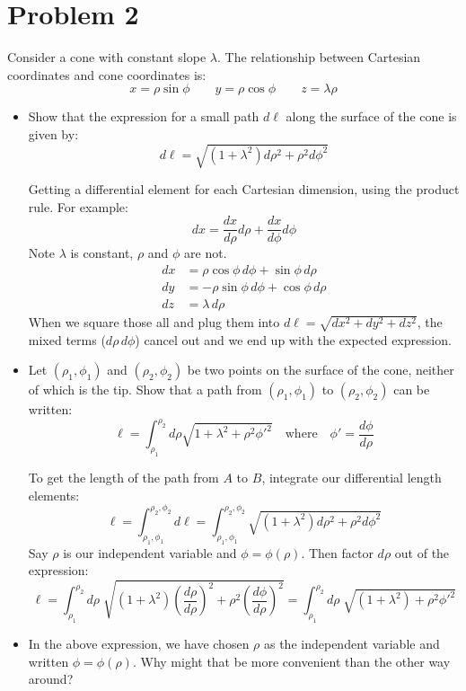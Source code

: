 \documentclass{article}
\newcommand{\purple}[1]{{\color{purple} #1}}
\begin{document}
\newpage

\section*{Problem 2}

Consider a cone with constant slope $\lambda$. The relationship between Cartesian coordinates and cone coordinates is:
$$
x=\rho \sin\phi
\quad \quad 
y=\rho \cos\phi
\quad \quad
z=\lambda\rho
$$

\begin{itemize}
    \item Show that the expression for a small path $d\ell$ along the surface of the cone is given by:
    $$
    d\ell = \sqrt{ \left( 1 + \lambda^2 \right) d\rho^2 + \rho^2 d\phi^2}
    $$
    
    \purple{
    Getting a differential element for each Cartesian dimension, using the product rule. For example:
    $$
    dx = \frac{dx}{d\rho} d\rho + \frac{dx}{d\phi} d\phi
    $$
    Note $\lambda$ is constant, $\rho$ and $\phi$ are not.
    \begin{align*}
        dx &= \rho \cos\phi \, d\phi + \sin\phi \, d\rho \\
        dy &= -\rho \sin\phi \, d\phi + \cos\phi \, d\rho \\
        dz &= \lambda \, d\rho
    \end{align*}
    When we square those all and plug them into $d\ell = \sqrt{ dx^2 + dy^2 + dz^2}$, the mixed terms ($d\rho \, d\phi$) cancel out and we end up with the expected expression.
    }
    \item Let $(\rho_1, \phi_1)$ and $(\rho_2, \phi_2)$ be two points on the surface of the cone, neither of which is the tip. Show that a path from $(\rho_1, \phi_1)$ to $(\rho_2, \phi_2)$ can be written:
    $$
    \ell = \displaystyle \int_{\rho_1}^{\rho_2} d\rho \sqrt{1 + \lambda^2 + \rho^2 \phi'^2}
    \quad \mathrm{where} \quad
    \phi' = \frac{d\phi}{d\rho}
    $$
    
    \purple{
    To get the length of the path from $A$ to $B$, integrate our differential length elements:
    $$
    \ell = \displaystyle\int_{\rho_1, \phi_1}^{\rho_2, \phi_2} d\ell = \displaystyle\int_{\rho_1, \phi_1}^{\rho_2, \phi_2} \sqrt{ \left( 1 + \lambda^2 \right) d\rho^2 + \rho^2 d\phi^2 }
    $$
    Say $\rho$ is our independent variable and $\phi = \phi(\rho)$. Then factor $d\rho$ out of the expression:
    $$
    \ell = \displaystyle\int_{\rho_1}^{\rho_2} d\rho \; \sqrt{ \left( 1 + \lambda^2 \right) \left( \frac{d\rho}{d\rho} \right)^2 + \rho^2 \left( \frac{d\phi}{d\rho} \right)^2 } = \displaystyle\int_{\rho_1}^{\rho_2} d\rho \; \sqrt{ \left( 1 + \lambda^2 \right) + \rho^2 \phi'^2 }
    $$
    }
    \item In the above expression, we have chosen $\rho$ as the independent variable and written $\phi = \phi(\rho)$. Why might that be more convenient than the other way around?


\end{itemize}
\end{document}
